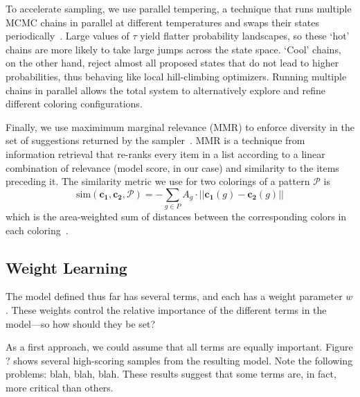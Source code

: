 To accelerate sampling, we use parallel tempering, a technique that runs multiple MCMC chains in parallel at different temperatures and swaps their states periodically~\cite{ParallelTempering}. Large values of $\tau$ yield flatter probability landscapes, so these `hot' chains are more likely to take large jumps across the state space. `Cool' chains, on the other hand, reject almost all proposed states that do not lead to higher probabilities, thus behaving like local hill-climbing optimizers. Running multiple chains in parallel allows the total system to alternatively explore and refine different coloring configurations.

Finally, we use maximimum marginal relevance (MMR) to enforce diversity in the set of suggestions returned by the sampler~\cite{MMR}. MMR is a technique from information retrieval that re-ranks every item in a list according to a linear combination of relevance (model score, in our case) and similarity to the items preceding it. The similarity metric we use for two colorings of a pattern $\mathcal{P}$ is
\begin{equation*}
\text{sim}(\mathbf{c_1}, \mathbf{c_2}, \mathcal{P}) = - \sum_{g \in P} {A_g \cdot ||\mathbf{c_1}(g) - \mathbf{c_2}(g)||}
\end{equation*}
which is the area-weighted sum of \lab distances between the corresponding colors in each coloring~.

\subsection{Weight Learning}
\label{sec:weights}


The model defined thus far has several terms, and each has a weight parameter $w$. These weights control the relative importance of the different terms in the model---so how should they be set?

As a first approach, we could assume that all terms are equally important. Figure ? shows several high-scoring samples from the resulting model. Note the following problems: blah, blah, blah. These results suggest that some terms are, in fact, more critical than others.

